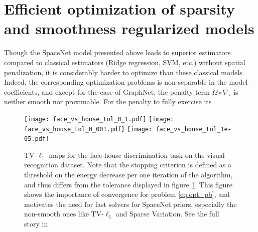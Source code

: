 \section{Efficient optimization of sparsity and smoothness regularized models}
Though the SpaceNet model presented above leads to superior estimators compared to classical estimators (Ridge regression, SVM, etc.) without spatial penalization, it is considerably harder to optimize than these classical models. Indeed, the corresponding optimization problems is non-separable in the model coefficients, and except for the case of GraphNet,
the penalty term $\Omega \circ \nabla_\tau$ is neither smooth nor proximable.
For the penalty to fully exercise its
\begin{figure}[!htb]
    \texttt{[image: face\_vs\_house\_tol\_0\_1.pdf]}%
\hfill%
\texttt{[image: face\_vs\_house\_tol\_0\_001.pdf]}%
\hfill%
\texttt{[image: face\_vs\_house\_tol\_1e-05.pdf]}%
%

\caption{TV-$\ell_1$ maps for the face-house discrimination task on
  the visual recognition dataset.
  Note that
  the stopping criterion is defined as a threshold on the energy
  decrease per one iteration of the algorithm, and thus differs from
  the tolerance displayed in figure \ref{Fig:benchmarks_prni}.  This figure shows
  the importance of convergence for problem \eqref{eq:opt_pb}, and motivates
  the need for fast solvers for SpaceNet priors, especially the non-smooth ones like TV-$\ell_1$ and Sparse Variation. See the full story in
 \citep{dohmatob2014benchmarking}}
  \label{Fig:benchmarks_prni}
\end{figure}

